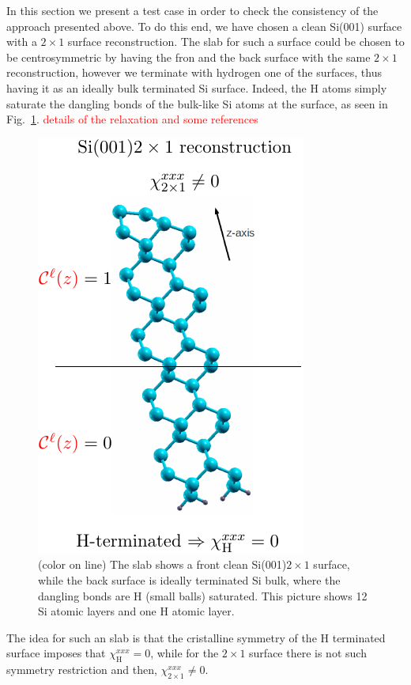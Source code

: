 \documentclass[floatfix,prb,aps,superscriptaddress,11pt,preprint,letterpaper]{revtex4}
\begin{document}
In this section we present a test case in order to check the
consistency of the approach presented above. To do this end,  we have chosen
a clean Si(001) surface  with a $2\times 1$ surface reconstruction.
The slab for such a surface could be chosen to be centrosymmetric 
by having the fron and the back surface with the same $2\times 1$
reconstruction, however we terminate with hydrogen one of the
surfaces, thus having it as an ideally bulk terminated Si
surface. Indeed, the H atoms simply saturate the dangling bonds of the
bulk-like Si atoms at the surface, as seen in Fig.~\ref{si2x1}. \textcolor{red}{details of the
 relaxation and some references}
\begin{figure}
\centering 
\includegraphics[scale=.8]{images/si2x1-crop}
\caption{(color on line) The slab shows a front clean Si(001)$2\times 1$ surface,
  while the back surface is ideally terminated Si bulk, where the  
  dangling bonds are H (small balls) saturated. This picture shows 12  
  Si atomic layers and one H atomic layer. 
\label{si2x1}} 
\end{figure} 
The idea for such an slab is that the cristalline symmetry of the
H terminated surface imposes that $\chi_{\mathrm{H}}^{xxx}=0$, while
for the $2\times 1$ surface there is not such symmetry restriction and
then, $\chi_{2\times 1}^{xxx}\ne 0$.
\end{document}
